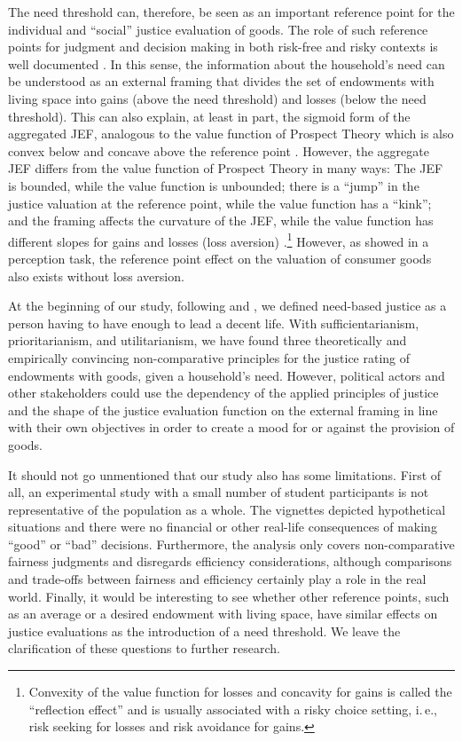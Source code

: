 \documentclass[12pt]{scrartcl}
\begin{document}
The need threshold can, therefore, be seen as an important reference point for the individual and ``social'' justice evaluation of goods.
The role of such reference points for judgment and decision making in both risk-free and risky contexts is well documented \citep{kuhberger_influence_1998,kuhberger_choice_2013}.
In this sense, the information about the household's need can be understood as an external framing that divides the set of endowments with living space into gains (above the need threshold) and losses (below the need threshold).
This can also explain, at least in part, the sigmoid form of the aggregated JEF, analogous to the value function of Prospect Theory which is also convex below and concave above the reference point \citep{kahneman_prospect_1979}.
However, the aggregate JEF differs from the value function of Prospect Theory in many ways: The JEF is bounded, while the value function is unbounded; there is a ``jump'' in the justice valuation at the reference point, while the value function has a ``kink''; and the framing affects the curvature of the JEF, while the value function has different slopes for gains and losses (loss aversion) \citep{tversky_loss_1991}.\footnote{Convexity of the value function for losses and concavity for gains is called the ``reflection effect'' and is usually associated with a risky choice setting, i.\,e., risk seeking for losses and risk avoidance for gains.} However, as \citet{trueblood_reference_2015} showed in a perception task, the reference point effect on the valuation of consumer goods also exists without loss aversion.

At the beginning of our study, following \citet{frankfurt_inequality_2015} and \citet{miller_principles_1999}, we defined need-based justice as a person having to have enough to lead a decent life.
With sufficientarianism, prioritarianism, and utilitarianism, we have found three theoretically and empirically convincing non-comparative principles for the justice rating of endowments with goods, given a household's need.
However, political actors and other stakeholders could use the dependency of the applied principles of justice and the shape of the justice evaluation function on the external framing in line with their own objectives in order to create a mood for or against the provision of goods.

It should not go unmentioned that our study also has some limitations.
First of all, an experimental study with a small number of student participants is not representative of the population as a whole.
The vignettes depicted hypothetical situations and there were no financial or other real-life consequences of making ``good'' or ``bad'' decisions.
Furthermore, the analysis only covers non-comparative fairness judgments and disregards efficiency considerations, although comparisons and trade-offs between fairness and efficiency certainly play a role in the real world.
Finally, it would be interesting to see whether other reference points, such as an average or a desired endowment with living space, have similar effects on justice evaluations as the introduction of a need threshold.
We leave the clarification of these questions to further research.
\end{document}
